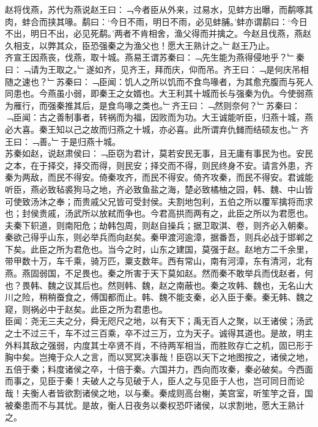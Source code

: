 {{赵将伐燕，苏代为燕说赵王曰：﹁今者臣从外来，过易水，见蚌方出曝，而鹬啄其肉，蚌合而挟其喙。鹬曰：‘今日不雨，明日不雨，必见蚌脯。’蚌亦谓鹬曰：‘今日不出，明日不出，必见死鹬。’两者不肯相舍，渔父得而并擒之。今赵且伐燕，燕赵久相支，以弊其众，臣恐强秦之为渔父也！愿大王熟计之。﹂赵王乃止。\\
齐宣王因燕丧，伐燕，取十城。燕易王谓苏秦曰：﹁先生能为燕得侵地乎？﹂秦曰：﹁请为王取之。﹂遂如齐，见齐王，拜而庆，仰而吊。齐王曰：﹁是何庆吊相随之速也？﹂苏秦曰：﹁臣闻：饥人之所以饥而不食鸟喙者，为其愈充腹而与死人同患也。今燕虽小弱，即秦王之女婿也。大王利其十城而长与强秦为仇。今使弱燕为雁行，而强秦推其后，是食鸟喙之类也。﹂齐王曰：﹁然则奈何？﹂苏秦曰：﹁臣闻：古之善制事者，转祸而为福，因败而为功。大王诚能听臣，归燕十城，燕必大喜。秦王知以己之故而归燕之十城，亦必喜。此所谓弃仇雠而结硕友也。﹂齐王曰：﹁善。﹂于是归燕十城。}\\
苏秦如赵，说赵肃侯曰：﹁臣窃为君计，莫若安民无事，且无庸有事民为也。安民之本，在于择交，择交而得，则民安；择交而不得，则民终身不安。请言外患，齐秦为两敌，而民不得安。倚秦攻齐，而民不得安。倚齐攻秦，而民不得安。君诚能听臣，燕必致毡裘狗马之地，齐必致鱼盐之海，楚必致橘柚之园，韩、魏、中山皆可使致汤沐之奉；而贵戚父兄皆可受封侯。夫割地包利，五伯之所以覆军擒将而求也；封侯贵戚，汤武所以放弒而争也。今君高拱而两有之，此臣之所以为君愿也。\\
夫秦下轵道，则南阳危；劫韩包周，则赵自操兵；据卫取淇、卷，则齐必入朝秦。秦欲己得乎山东，则必举兵而向赵矣。秦甲渡河逾漳，据番吾，则兵必战于邯郸之下矣。此臣之所为君危也。当今之时，山东之建国，莫强于赵。赵地方二千余里，带甲数十万，车千乘，骑万匹，粟支数年。西有常山，南有河漳，东有清河，北有燕。燕固弱国，不足畏也。秦之所害于天下莫如赵。然而秦不敢举兵而伐赵者，何也？畏韩、魏之议其后也。然则韩、魏，赵之南蔽也。秦之攻韩、魏也，无名山大川之险，稍稍蚕食之，傅国都而止。韩、魏不能支秦，必入臣于秦。秦无韩、魏之窥，则祸必中于赵矣。此臣之所为君患也。\\
臣闻：尧无三夫之分，舜无咫尺之地，以有天下；禹无百人之聚，以王诸侯；汤武之士不过三千，车不过三百乘，卒不过三万，立为天子。诚得其道也。是故，明主外料其敌之强弱，内度其士卒贤不肖，不待两军相当，而胜败存亡之机，固已形于胸中矣。岂掩于众人之言，而以冥冥决事哉！臣窃以天下之地图按之，诸侯之地，五倍于秦；料度诸侯之卒，十倍于秦。六国并力，西向而攻秦，秦必破矣。今西面而事之，见臣于秦！夫破人之与见破于人，臣人之与见臣于人也，岂可同日而论哉！夫衡人者皆欲割诸侯之地，以与秦。秦成则高台榭，美宫室，听笙竽之音，国被秦患而不与其忧。是故，衡人日夜务以秦权恐吓诸侯，以求割地，愿大王熟计之。\\
}
